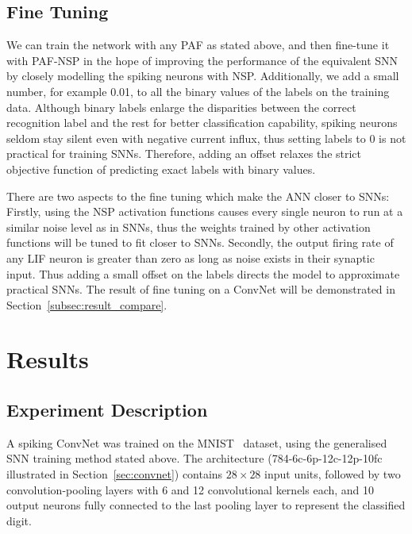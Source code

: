 	\subsection{Fine Tuning}
	We can train the network with any PAF as stated above, and then fine-tune it with PAF-NSP in the hope of improving the performance of the equivalent SNN by closely modelling the spiking neurons with NSP.
	Additionally, we add a small number, for example 0.01, to all the binary values of the labels on the training data.
	Although binary labels enlarge the disparities between the correct recognition label and the rest for better classification capability, 
	spiking neurons seldom stay silent even with negative current influx, thus setting labels to 0 is not practical for training SNNs.
	Therefore, adding an offset relaxes the strict objective function of predicting exact labels with binary values.
	
	
	There are two aspects to the fine tuning which make the ANN closer to SNNs:
	Firstly, using the NSP activation functions causes every single neuron to run at a similar noise level as in SNNs, thus the weights trained by other activation functions will be tuned to fit closer to SNNs.
	Secondly, the output firing rate of any LIF neuron is greater than zero as long as noise exists in their synaptic input.
	Thus adding a small offset on the labels directs the model to approximate practical SNNs. 
	The result of fine tuning on a ConvNet will be demonstrated in Section~\ref{subsec:result_compare}.
	
\section{Results}
\label{sec:iconipResult}
	\subsection{Experiment Description}
	A spiking ConvNet was trained on the MNIST~\cite{lecun1998gradient} dataset, 
	using the generalised SNN training method stated above.
	The architecture (784-6c-6p-12c-12p-10fc illustrated in Section~\ref{sec:convnet}) contains $28\times28$ input units, followed by two convolution-pooling layers with 6 and 12 convolutional kernels each, and 10 output neurons fully connected to the last pooling layer to represent the classified digit.
	
